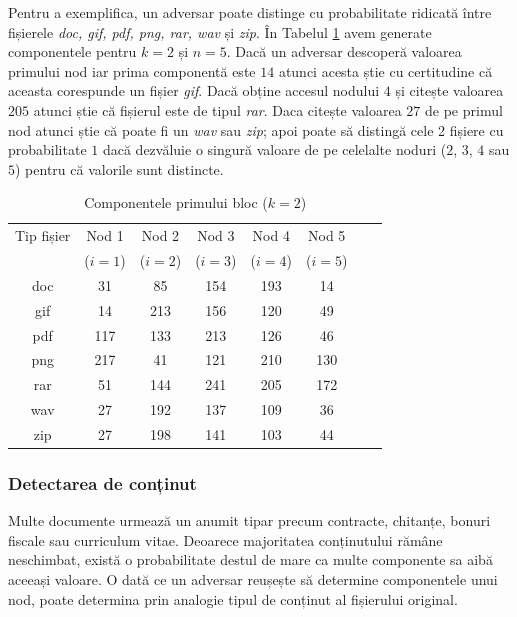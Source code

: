 \documentclass[oneside, 12pt]{book}
\begin{document}
Pentru a exemplifica, un adversar poate distinge cu probabilitate ridicată între fișierele \textit{doc, gif, pdf, png, rar, wav} și \textit{zip}. În Tabelul {\ref{table:shares}} avem generate componentele pentru $k = 2$ și $n = 5$.
Dacă un adversar descoperă valoarea primului nod iar prima componentă este $14$ atunci acesta știe cu certitudine că aceasta corespunde un fișier \textit{gif}. Dacă obține accesul nodului $4$ și citește valoarea $205$ atunci știe că fișierul este de tipul \textit{rar}. Daca citește valoarea $27$ de pe primul nod atunci știe că poate fi un \textit{wav} sau \textit{zip}; apoi poate să distingă cele 2 fișiere cu probabilitate $1$ dacă dezvăluie o singură valoare de pe celelalte noduri ($2$, $3$, $4$ sau $5$) pentru că valorile sunt distincte.


\begin{table}[t]
\begin{center}
\caption{Componentele primului bloc ($k=2$)}\label{tb:margins}
\label{table:shares}
\begin{tabular}{cccccccc}
Tip fișier & Nod 1 & Nod 2 & Nod 3 & Nod 4 & Nod 5 \\
  & ($i=1$) & ($i=2$) & ($i=3$) & ($i=4$) & ($i=5$) \\
\hline
doc & 31 & 85 & 154 & 193 & 14 \\
gif & 14 & 213 & 156 & 120 & 49 \\
pdf & 117 & 133 & 213 & 126 & 46 \\
png & 217 & 41 & 121 & 210 & 130 \\ 
rar & 51 & 144 & 241 & 205 & 172  \\
wav & 27 & 192 & 137 & 109 & 36 \\
zip & 27 & 198 & 141 & 103 & 44 \\ \hline
\end{tabular}
\end{center}
\bigskip
\end{table}




\subsubsection{Detectarea de conținut}
\label{subsec:file_content_detection}

Multe documente urmează un anumit tipar precum contracte, chitanțe, bonuri fiscale sau curriculum vitae. Deoarece majoritatea conținutului rămâne neschimbat, există o probabilitate destul de mare ca multe componente sa aibă aceeași valoare. O dată ce un adversar reușește să determine componentele unui nod, poate determina prin analogie tipul de conținut al fișierului original.
\end{document}
